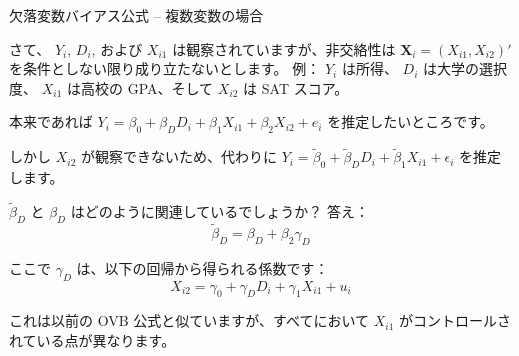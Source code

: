 \documentclass[11pt,handout]{beamer}
\newenvironment{wideitemize}{\itemize\addtolength{\itemsep}{10pt}}{\enditemize}
\begin{document}
\begin{frame}{欠落変数バイアス公式 -- 複数変数の場合}
	\begin{wideitemize}
	
	\item
	さて、 $Y_i$, $D_i$, および $X_{i1}$ は観察されていますが、非交絡性は $\bm{X}_i = (X_{i1}, X_{i2})'$ を条件としない限り成り立たないとします。 \pause 例： $Y_i$ は所得、 $D_i$ は大学の選択度、 $X_{i1}$ は高校の GPA、そして $X_{i2}$ は SAT スコア。
		
	\pause	
	\item 本来であれば $Y_i = \beta_0 + \beta_{D} D_i + \beta_{1} X_{i1} + \beta_{2} X_{i2}+e_i$ を推定したいところです。
	
	\pause
	\item
	しかし $X_{i2}$ が観察できないため、代わりに $Y_i = \tilde\beta_0 + \tilde\beta_D D_i + \tilde\beta_1 X_{i1} + \epsilon_i$ を推定します。
	
	\pause
	\item
	$\tilde\beta_D$ と $\beta_D$ はどのように関連しているでしょうか？ \pause 答え： $$\tilde\beta_D= \beta_D+ \beta_2 \gamma_D$$ 
	
	\noindent ここで $\gamma_D$ は、以下の回帰から得られる係数です： $$X_{i2} = \gamma_0 + \gamma_D D_i + \gamma_1 X_{i1} + u_i$$ 

	\item これは以前の OVB 公式と似ていますが、すべてにおいて $X_{i1}$ がコントロールされている点が異なります。
\end{wideitemize}
	
\end{frame}
\end{document}

